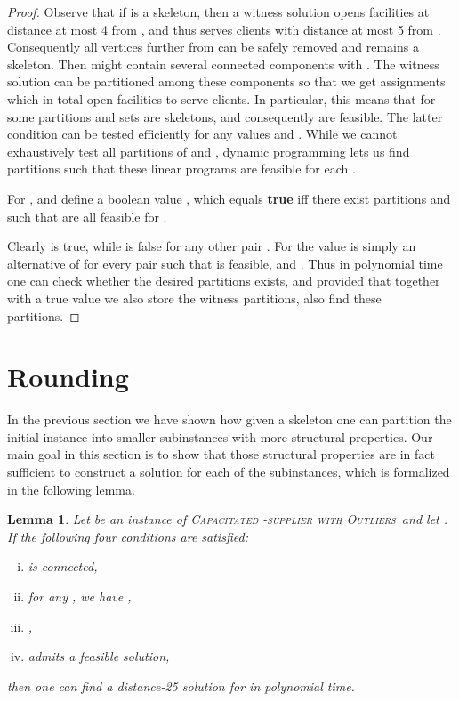 \documentclass{article}
\newcommand{\fullsup}{\textsc{Capacitated} -\textsc{supplier with Outliers}}
\theoremstyle{plain}
\newtheorem{lemma}[theorem]{Lemma}
\theoremstyle{definition}
\begin{document}
\begin{proof}
Observe that if  is a skeleton, then a witness solution 
opens facilities at distance at most 4 from , and thus serves clients
with distance at most 5 from . Consequently all vertices further from  can
be safely removed and  remains a skeleton.
Then  might contain several connected components 
with .  The witness solution
 can be partitioned among these components so that we get assignments
 which in total open  facilities to serve  clients. In particular,
this means that for some partitions  and 
sets  are skeletons, and consequently
 are feasible. The latter condition can be
tested efficiently for any values  and .
While we cannot exhaustively test all partitions of  and , dynamic
programming lets us find partitions such that these linear programs are
feasible for each .

For ,  and  
define a boolean value , which equals {\bf true} iff there exist partitions
 and  such that
 are all feasible for .

Clearly  is true, while
 is false for any other pair .
For  the value  is simply an alternative of
 for every pair  such that
 is feasible,  and .
Thus in polynomial time one can check whether the desired partitions exists, 
and provided that together with a true value we also store the witness
partitions, also find these partitions.
\end{proof}



\section{Rounding}
\label{sec:rounding}

In the previous section we have shown how given a skeleton 
one can partition the initial instance into smaller subinstances
with more structural properties.
Our main goal in this section is to show that those structural
properties are in fact sufficient to construct a solution
for each of the subinstances, which is formalized in the following lemma.

\begin{lemma}\label{lem:tra}
Let  be an instance of \fullsup\  
and let .
If the following four conditions are satisfied:
\begin{enumerate}[(i)]
  \item  is connected,
  \item\label{it:two} for any ,  we have ,
  \item\label{it:three} ,
  \item  admits a feasible solution,
\end{enumerate}
then one can find a distance-25 solution for  in polynomial time.
\end{lemma}
\end{document}
